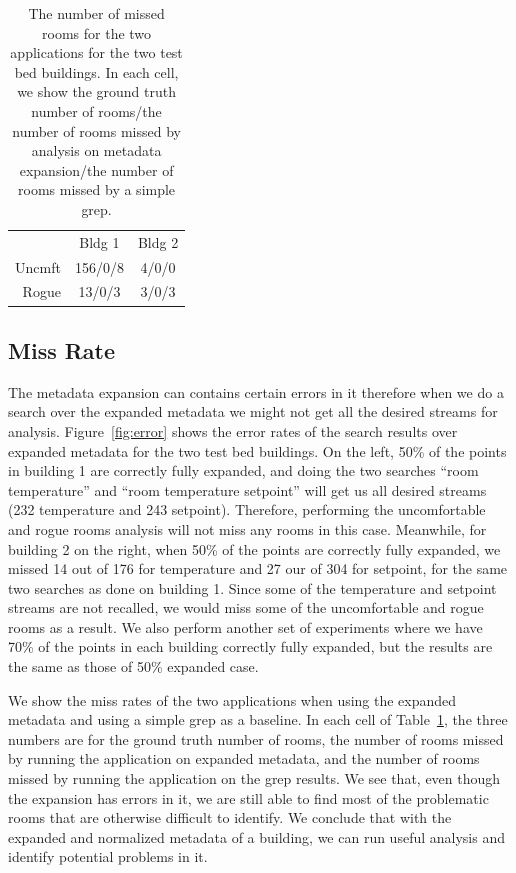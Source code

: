 \begin{table}[h!]
 \begin{center}
\begin{tabular}{rcc}
\multicolumn{1}{l}{} & Bldg 1                 & Bldg 2                  \\ \cline{2-3} 
Uncmft               & \multicolumn{1}{|c}{156/0/8} & \multicolumn{1}{|c|}{4/0/0} \\ \cline{2-3} 
Rogue                & \multicolumn{1}{|c}{13/0/3} & \multicolumn{1}{|c|}{3/0/3} \\ \cline{2-3} 
\end{tabular}
 \end{center}
 \caption{The number of missed rooms for the two applications for the two test bed buildings. In each cell, we show the ground truth number of rooms/the number of rooms missed by analysis on metadata expansion/the number of rooms missed by a simple grep.}
 \label{tab:error}
\end{table}

\subsection{Miss Rate}
The metadata expansion can contains certain errors in it therefore when we do a search over the expanded metadata we might not get all the desired streams for analysis. Figure~\ref{fig:error} shows the error rates of the search results over expanded metadata for the two test bed buildings. On the left, 50\% of the points in building 1 are correctly fully expanded, and doing the two searches ``room temperature'' and ``room temperature setpoint'' will get us all desired streams (232 temperature and 243 setpoint). Therefore, performing the uncomfortable and rogue rooms analysis will not miss any rooms in this case. Meanwhile, for building 2 on the right, when 50\% of the points are correctly fully expanded, we missed 14 out of 176 for temperature and 27 our of 304 for setpoint, for the same two searches as done on building 1. Since some of the temperature and setpoint streams are not recalled, we would miss some of the uncomfortable and rogue rooms as a result.
We also perform another set of experiments where we have 70\% of the points in each building correctly fully expanded, but the results are the same as those of 50\% expanded case.

We show the miss rates of the two applications when using the expanded metadata and using a simple grep as a baseline. In each cell of Table~\ref{tab:error}, the three numbers are for the ground truth number of rooms, the number of rooms missed by running the application on expanded metadata, and the number of rooms missed by running the application on the grep results. We see that, even though the expansion has errors in it, we are still able to find most of the problematic rooms that are otherwise difficult to identify. We conclude that with the expanded and normalized metadata of a building, we can run useful analysis and identify potential problems in it.
